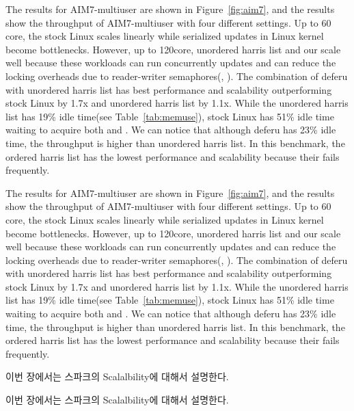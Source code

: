 The results for AIM7-multiuser are shown in Figure~\ref{fig:aim7}, and the
results show the throughput of AIM7-multiuser with four different settings.
Up to 60 core, the stock Linux scales linearly while serialized updates in
Linux kernel become bottlenecks. 
However, up to 120core, unordered harris list and our  scale well because
these workloads can run concurrently updates and can reduce the locking
overheads due to reader-writer semaphores(,
).
The combination of deferu with unordered harris list has best performance and
scalability outperforming stock Linux by 1.7x and unordered harris list by
1.1x.
While the unordered harris list has 19\% idle time(see
Table~\ref{tab:memuse}), stock Linux has 51\% idle time waiting to acquire
both  and .
We can notice that although deferu has 23\% idle time, the throughput is higher than
unordered harris list.
In this benchmark, the ordered harris list has the lowest performance and
scalability because their  fails frequently.

The results for AIM7-multiuser are shown in Figure~\ref{fig:aim7}, and the
results show the throughput of AIM7-multiuser with four different settings.
Up to 60 core, the stock Linux scales linearly while serialized updates in
Linux kernel become bottlenecks. 
However, up to 120core, unordered harris list and our  scale well because
these workloads can run concurrently updates and can reduce the locking
overheads due to reader-writer semaphores(,
).
The combination of deferu with unordered harris list has best performance and
scalability outperforming stock Linux by 1.7x and unordered harris list by
1.1x.
While the unordered harris list has 19\% idle time(see
Table~\ref{tab:memuse}), stock Linux has 51\% idle time waiting to acquire
both  and .
We can notice that although deferu has 23\% idle time, the throughput is higher than
unordered harris list.
In this benchmark, the ordered harris list has the lowest performance and
scalability because their  fails frequently.
\else

\fi




\ifkor
이번 장에서는 스파크의 Scalalbility에 대해서 설명한다.
\else

\fi



\ifkor
이번 장에서는 스파크의 Scalalbility에 대해서 설명한다.
\else

\fi

